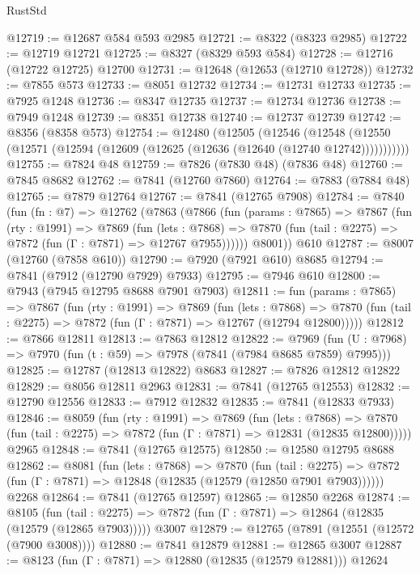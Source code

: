 \begin{lexlean}{RustStd}
\begin{coremodule}
@12719 := @12687 @584 @593 @2985
@12721 := @8322 (@8323 @2985)
@12722 := @12719 @12721
@12725 := @8327 (@8329 @593 @584)
@12728 := @12716 (@12722 @12725) @12700
@12731 := @12648 (@12653 (@12710 @12728))
@12732 := @7855 @573
@12733 := @8051 @12732
@12734 := @12731 @12733
@12735 := @7925 @1248
@12736 := @8347 @12735
@12737 := @12734 @12736
@12738 := @7949 @1248
@12739 := @8351 @12738
@12740 := @12737 @12739
@12742 := @8356 (@8358 @573)
@12754 := @12480
    (@12505
      (@12546
        (@12548 (@12550 (@12571 (@12594 (@12609 (@12625 (@12636 (@12640 (@12740 @12742)))))))))))
@12755 := @7824 @48
@12759 := @7826 (@7830 @48) (@7836 @48)
@12760 := @7845 @8682
@12762 := @7841 (@12760 @7860)
@12764 := @7883 (@7884 @48)
@12765 := @7879 @12764
@12767 := @7841 (@12765 @7908)
@12784 := @7840
    (fun (fn : @7) =>
    @12762
      (@7863
        (@7866
          (fun (params : @7865) =>
          @7867
            (fun (rty : @1991) =>
            @7869
              (fun (lets : @7868) =>
              @7870 (fun (tail : @2275) => @7872 (fun (Γ : @7871) => @12767 @7955))))))
        @8001))
    @610
@12787 := @8007 (@12760 (@7858 @610))
@12790 := @7920 (@7921 @610) @8685
@12794 := @7841 (@7912 (@12790 @7929) @7933)
@12795 := @7946 @610
@12800 := @7943 (@7945 @12795 @8688 @7901 @7903)
@12811 := fun (params : @7865) =>
  @7867
    (fun (rty : @1991) =>
    @7869
      (fun (lets : @7868) =>
      @7870 (fun (tail : @2275) => @7872 (fun (Γ : @7871) => @12767 (@12794 @12800)))))
@12812 := @7866 @12811
@12813 := @7863 @12812
@12822 := @7969
    (fun (U : @7968) => @7970 (fun (t : @59) => @7978 (@7841 (@7984 @8685 @7859) @7995)))
@12825 := @12787 (@12813 @12822) @8683
@12827 := @7826 @12812 @12822
@12829 := @8056 @12811 @2963
@12831 := @7841 (@12765 @12553)
@12832 := @12790 @12556
@12833 := @7912 @12832
@12835 := @7841 (@12833 @7933)
@12846 := @8059
    (fun (rty : @1991) =>
    @7869
      (fun (lets : @7868) =>
      @7870 (fun (tail : @2275) => @7872 (fun (Γ : @7871) => @12831 (@12835 @12800)))))
    @2965
@12848 := @7841 (@12765 @12575)
@12850 := @12580 @12795 @8688
@12862 := @8081
    (fun (lets : @7868) =>
    @7870
      (fun (tail : @2275) =>
      @7872 (fun (Γ : @7871) => @12848 (@12835 (@12579 (@12850 @7901 @7903))))))
    @2268
@12864 := @7841 (@12765 @12597)
@12865 := @12850 @2268
@12874 := @8105
    (fun (tail : @2275) => @7872 (fun (Γ : @7871) => @12864 (@12835 (@12579 (@12865 @7903)))))
    @3007
@12879 := @12765 (@7891 (@12551 (@12572 (@7900 @3008))))
@12880 := @7841 @12879
@12881 := @12865 @3007
@12887 := @8123 (fun (Γ : @7871) => @12880 (@12835 (@12579 @12881))) @12624

\end{coremodule}
\end{lexlean}
